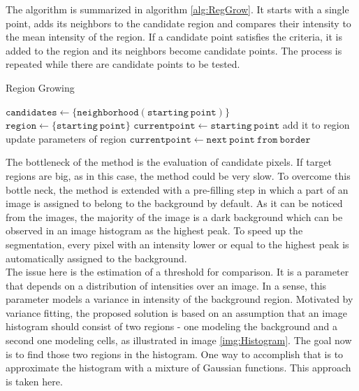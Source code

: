 The algorithm is summarized in algorithm \ref{alg:RegGrow}. It starts with a single point, adds its neighbors to the candidate region and compares their intensity to the mean intensity of the region. If a candidate point satisfies the criteria, it is added to the region and its neighbors become candidate points. The process is repeated while there are candidate points to be tested. \\

\begin{algorithm}
\caption{Region Growing }
  \label{alg:RegGrow}
\begin{algorithmic}[1]
 \State $\mathtt{candidates} \gets \{ \mathtt{neighborhood}(\mathtt{starting \ point}) \}$
 \State $\mathtt{region} \gets \{ \mathtt{starting \ point} \}$
 \State $\mathtt{current point} \gets \mathtt{starting \ point}$
 			\State add it to region
 			\State update parameters of region
 		\EndIf 
 	\EndFor
 	\State $\mathtt{current point} \gets \mathtt{next \ point \ from \ border}$
 \EndWhile
 \EndFunction
\end{algorithmic}
\end{algorithm}

The bottleneck of the method is the evaluation of candidate pixels. If target regions are big, as in this case, the method could be very slow. To overcome this bottle neck, the method is extended with a pre-filling step in which a part of an image is assigned to belong to the background by default. As it can be noticed from the images, the majority of the image is a dark background which can be observed in an image histogram as the highest peak. To speed up the segmentation, every pixel with an intensity lower or equal to the highest peak is automatically assigned to the  background.   \\

The issue here is the estimation of a threshold for comparison. It is a parameter that depends on a distribution of intensities over an image. In a sense, this parameter models a variance in intensity of the background region. Motivated by variance fitting, the proposed solution is based on an assumption that an image histogram should consist of two regions - one modeling the background and a second one modeling cells, as illustrated in image \ref{img:Histogram}. The goal now is to find those two regions in the histogram. One way to accomplish that is to approximate the histogram with a mixture of Gaussian functions. This approach is taken here.  

